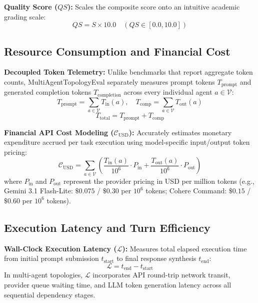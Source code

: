 \textbf{Quality Score ($QS$):} Scales the composite score onto an intuitive academic grading scale:
\begin{equation}
QS = S \times 10.0 \quad (QS \in [0.0, 10.0])
\end{equation}

\subsection{Resource Consumption and Financial Cost}
\textbf{Decoupled Token Telemetry:} Unlike benchmarks that report aggregate token counts, MultiAgentTopologyEval separately measures prompt tokens $T_{\text{prompt}}$ and generated completion tokens $T_{\text{completion}}$ across every individual agent $a \in \mathcal{V}$:
\begin{equation}
T_{\text{prompt}} = \sum_{a \in \mathcal{V}} T_{\text{in}}(a), \quad T_{\text{comp}} = \sum_{a \in \mathcal{V}} T_{\text{out}}(a)
\end{equation}
\begin{equation}
T_{\text{total}} = T_{\text{prompt}} + T_{\text{comp}}
\end{equation}

\textbf{Financial API Cost Modeling ($\mathcal{C}_{\text{USD}}$):} Accurately estimates monetary expenditure accrued per task execution using model-specific input/output token pricing:
\begin{equation}
\mathcal{C}_{\text{USD}} = \sum_{a \in \mathcal{V}} \left( \frac{T_{\text{in}}(a)}{10^6} \cdot P_{\text{in}} + \frac{T_{\text{out}}(a)}{10^6} \cdot P_{\text{out}} \right)
\end{equation}
where $P_{\text{in}}$ and $P_{\text{out}}$ represent the provider pricing in USD per million tokens (e.g., Gemini 3.1 Flash-Lite: $\$0.075$ / $\$0.30$ per $10^6$ tokens; Cohere Command: $\$0.15$ / $\$0.60$ per $10^6$ tokens).

\subsection{Execution Latency and Turn Efficiency}
\textbf{Wall-Clock Execution Latency ($\mathcal{L}$):} Measures total elapsed execution time from initial prompt submission $t_{\text{start}}$ to final response synthesis $t_{\text{end}}$:
\begin{equation}
\mathcal{L} = t_{\text{end}} - t_{\text{start}}
\end{equation}
In multi-agent topologies, $\mathcal{L}$ incorporates API round-trip network transit, provider queue waiting time, and LLM token generation latency across all sequential dependency stages.

